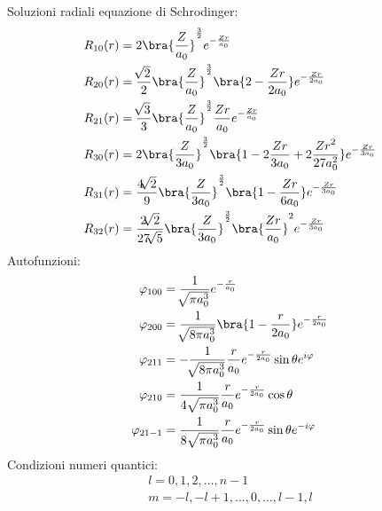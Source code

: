 

Soluzioni radiali equazione di Schrodinger:
\begin{align*}
    R_{10}(r) &= 2 \bra{\frac{Z}{a_0}}^\frac{3}{2} e^{-\frac{Z r}{a_0}} \\
    R_{20}(r) &= \frac{\sqrt[]{2}}{2} \bra{\frac{Z}{a_0}}^\frac{3}{2} \bra{2-\frac{Zr}{2a_0}} e^{-\frac{Z r}{2a_0}} \\
     R_{21}(r) &= \frac{\sqrt[]{3}}{3} \bra{\frac{Z}{a_0}}^\frac{3}{2} \frac{Zr}{a_0} e^{-\frac{Z r}{a_0}} \\
    R_{30}(r) &= 2 \bra{\frac{Z}{3a_0}}^\frac{3}{2} \bra{1 - 2 \frac{Zr}{3a_0} + 2 \frac{{Zr}^2}{27a_0^2}} e^{-\frac{Z r}{3a_0}} \\
     R_{31}(r) &= \frac{4\sqrt[]{2}}{9} \bra{\frac{Z}{3a_0}}^\frac{3}{2} \bra{1-\frac{Zr}{6a_0}} e^{-\frac{Z r}{3a_0}} \\
     R_{32}(r) &= \frac{2\sqrt[]{2}}{27\sqrt[]{5}} \bra{\frac{Z}{3a_0}}^\frac{3}{2} \bra{\frac{Zr}{a_0}}^2 e^{-\frac{Z r}{3a_0}}
\end{align*}
Autofunzioni:
\begin{align*}
    \varphi_{100} &= \frac{1}{\sqrt[]{\pi a_0^3}} e^{-\frac{r}{a_0}} \\
    \varphi_{200} &= \frac{1}{\sqrt[]{8\pi a_0^3}} \bra{1-\frac{r}{2a_0}} e^{-\frac{r}{2a_0}} \\
    \varphi_{211} &= -\frac{1}{\sqrt[]{8\pi a_0^3}} \frac{r}{a_0} e^{-\frac{r}{2a_0}} \sin\theta e^{i\varphi} \\
    \varphi_{210} &= \frac{1}{4\; \sqrt[]{\pi a_0^3}} \frac{r}{a_0} e^{-\frac{r}{2a_0}} \cos\theta \\
    \varphi_{21-1} &= \frac{1}{8\; \sqrt[]{\pi a_0^3}} \frac{r}{a_0} e^{-\frac{r}{2a_0}} \sin\theta e^{-i\varphi} 
\end{align*}
Condizioni numeri quantici:
\begin{gather*}
    l = 0,1,2,\dots, n-1 \\
    m = -l,-l+1,\dots,0,\dots,l-1,l
\end{gather*}